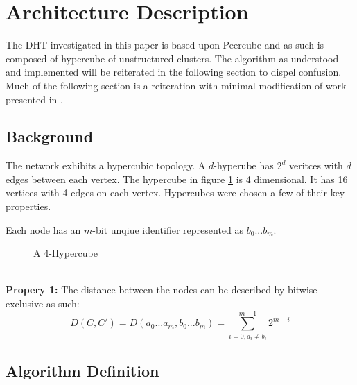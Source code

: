 \documentclass[apa6]{IEEEtran}
\begin{document}
\section{Architecture Description}
The DHT investigated in this paper is based upon Peercube \cite{anceaume2008peercube} and as such is composed of hypercube of unstructured clusters. The algorithm as understood and implemented will be reiterated in the following section to dispel confusion. Much of the following section is a reiteration with minimal modification of work presented in \cite{anceaume2008peercube}.

	\subsection{Background}
		The network exhibits a hypercubic topology. 
		A $d$-hyperube has $2^d$ veritces with $d$ edges between each vertex. 
		The hypercube in figure \ref{fig:4H} is 4 dimensional. 
		It has 16 vertices with 4 edges on each vertex.
		Hypercubes were chosen a few of their key properties.
		
		Each node has an $m$-bit unqiue identifier represented as $b_0...b_m.$
		
    \begin{figure}[!t]
        \hspace*{-0.05\linewidth}
        \centering
		
        \captionsetup{}
        \caption{A 4-Hypercube}
        \label{fig:4H}
    \end{figure}

		\noindent
		\\
		\textbf{Propery 1:} The distance between the nodes can be described by bitwise exclusive as such:
		\begin{equation}
			D(C,C') = D(a_0...a_m, b_0...b_m)=\sum\limits_{i=0,a_i \neq b_i}^{m-1} 2^{m-i}
		\end{equation}
	\subsection{Algorithm Definition}
		\blindtext
		
\end{document}

